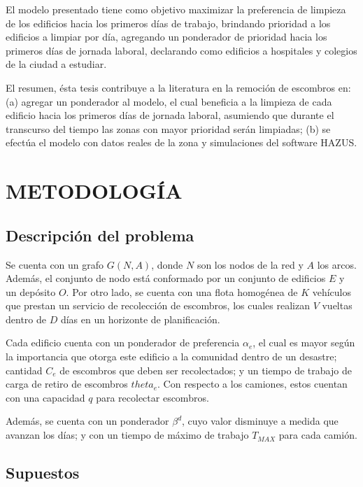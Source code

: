 \documentclass[letterpaper,conference]{IEEEtran}
\begin{document}
El modelo presentado tiene como objetivo maximizar la preferencia de limpieza de los edificios hacia los primeros días de trabajo, brindando prioridad a los edificios a limpiar por día, agregando un ponderador de prioridad hacia los primeros días de jornada laboral, declarando como edificios a hospitales y colegios de la ciudad a estudiar.

El resumen, ésta tesis contribuye a la literatura en la remoción de escombros en: (a) agregar un ponderador al modelo, el cual beneficia a la limpieza de cada edificio hacia los primeros días de jornada laboral, asumiendo que durante el transcurso del tiempo las zonas con mayor prioridad serán limpiadas; (b) se efectúa el modelo con datos reales de la zona y simulaciones del software HAZUS.

\section{METODOLOGÍA}

\subsection{Descripción del problema}

Se cuenta con un grafo $G(N,A)$, donde $N$ son los nodos de la red y $A$ los arcos. Además, el conjunto de nodo está conformado por un conjunto de edificios $E$ y un depósito $O$. Por otro lado, se cuenta con una flota homogénea de $K$ vehículos que prestan un servicio de recolección de escombros, los cuales realizan $V$ vueltas dentro de $D$ días en un horizonte de planificación.

Cada edificio cuenta con un ponderador de preferencia $\alpha_e$, el cual es mayor según la importancia que otorga este edificio a la comunidad dentro de un desastre; cantidad $C_e$ de escombros que deben ser recolectados; y un tiempo de trabajo de carga de retiro de escombros $theta_e$. Con respecto a los camiones, estos cuentan con una capacidad $q$ para recolectar escombros.

Además, se cuenta con un ponderador $\beta^d$, cuyo valor disminuye a medida que avanzan los días; y con un tiempo de máximo de trabajo $T_{MAX}$ para cada camión.

\subsection{Supuestos}
\end{document}
